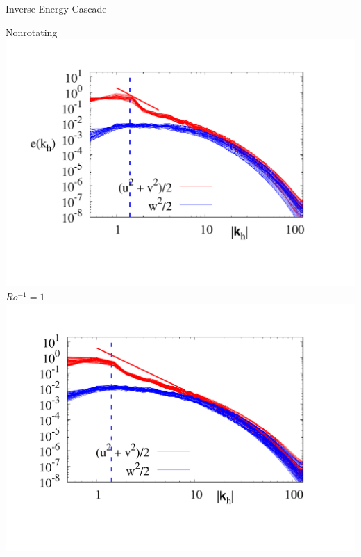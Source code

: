 \documentclass[aspecttatio=169]{beamer}
\begin{document}
\begin{frame}{Inverse Energy Cascade}

        \centering
        {\small Nonrotating}
        \includegraphics[width=.91\textwidth]{images/B30Spec.pdf}
    \emp
        \centering
        {\small $Ro^{-1} = 1$}
        \includegraphics[width=.99\textwidth]{images/Om1Spec.pdf}
    \emp


\end{frame}
\end{document}
